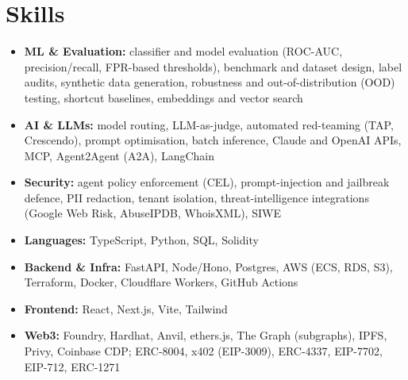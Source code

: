 \documentclass[a4paper,11pt]{article}
\newcommand{\ERC}{\mbox{ERC-8004}}
\begin{document}

\section{Skills}

\begin{itemize}[nosep, leftmargin=1em, itemsep=1.5pt]
\item[--] \textbf{ML \& Evaluation:} classifier and model evaluation (ROC-AUC, precision/recall, FPR-based thresholds), benchmark and dataset design, label audits, synthetic data generation, robustness and \mbox{out-of-distribution} (OOD) testing, shortcut baselines, embeddings and vector search
\item[--] \textbf{AI \& LLMs:} model routing, LLM-as-judge, automated red-teaming (TAP, Crescendo), prompt optimisation, batch inference, Claude and OpenAI APIs, MCP, Agent2Agent (A2A), LangChain
\item[--] \textbf{Security:} agent policy enforcement (CEL), prompt-injection and jailbreak defence, PII redaction, tenant isolation, threat-intelligence integrations (Google Web Risk, AbuseIPDB, WhoisXML), SIWE
\item[--] \textbf{Languages:} TypeScript, Python, SQL, Solidity
\item[--] \textbf{Backend \& Infra:} FastAPI, Node/Hono, Postgres, AWS (ECS, RDS, S3), Terraform, Docker, Cloudflare Workers, GitHub Actions
\item[--] \textbf{Frontend:} React, Next.js, Vite, Tailwind
\item[--] \textbf{Web3:} Foundry, Hardhat, Anvil, ethers.js, The Graph (subgraphs), IPFS, Privy, Coinbase CDP; \ERC{}, x402 (EIP-3009), ERC-4337, EIP-7702, EIP-712, ERC-1271
\end{itemize}
\end{document}
